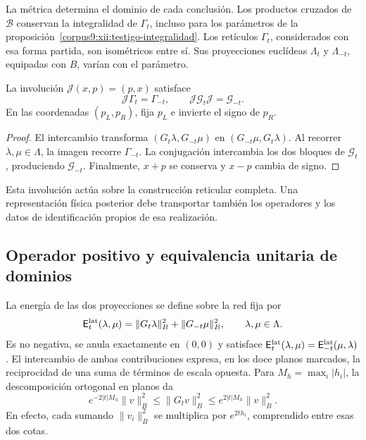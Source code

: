 La métrica determina el dominio de cada conclusión. Los productos
cruzados de \(\mathcal B\) conservan la integralidad de
\(\Gamma_t\), incluso para los parámetros de la
proposición~\ref{corpus9:xii:testigo-integralidad}. Los retículos
\(\Gamma_t\), considerados con esa forma partida, son isométricos
entre sí. Sus proyecciones euclídeas \(\Lambda_t\) y
\(\Lambda_{-t}\), equipadas con \(B\), varían con el parámetro.

\begin{proposition}
\label{corpus9:xii:involucion-partida}
La involución \(\mathcal J(x,p)=(p,x)\) satisface
\[
 \mathcal J\Gamma_t=\Gamma_{-t},\qquad
 \mathcal J\mathcal G_t\mathcal J=\mathcal G_{-t}.
\]
En las coordenadas \((p_L,p_R)\), fija \(p_L\) e invierte
el signo de \(p_R\).
\end{proposition}
\begin{proof}
El intercambio transforma \((G_t\lambda,G_{-t}\mu)\) en
\((G_{-t}\mu,G_t\lambda)\). Al recorrer \(\lambda,\mu\in\Lambda\),
la imagen recorre \(\Gamma_{-t}\). La conjugación intercambia los
dos bloques de \(\mathcal G_t\), produciendo \(\mathcal G_{-t}\).
Finalmente, \(x+p\) se conserva y \(x-p\) cambia de signo.
\end{proof}

Esta involución actúa sobre la construcción reticular completa. Una
representación física posterior debe transportar también los operadores
y los datos de identificación propios de esa realización.

\subsection{Operador positivo y equivalencia unitaria de dominios}
\label{corpus9:xii:energia-reticular}

La energía de las dos proyecciones se define sobre la red fija por
\begin{equation}
 \mathsf E_t^{\rm lat}(\lambda,\mu)
 =\|G_t\lambda\|_B^2+\|G_{-t}\mu\|_B^2,
 \qquad \lambda,\mu\in\Lambda.
 \label{corpus9:xii:energia}
\end{equation}
Es no negativa, se anula exactamente en \((0,0)\) y satisface
\(\mathsf E_t^{\rm lat}(\lambda,\mu)
=\mathsf E_{-t}^{\rm lat}(\mu,\lambda)\). El intercambio de ambas
contribuciones expresa, en los doce planos marcados, la reciprocidad
de una suma de términos de escala opuesta. Para
\(M_h=\max_i|h_i|\), la descomposición ortogonal en planos da
\begin{equation}
 e^{-2|t|M_h}\|v\|_B^2\leq\|G_tv\|_B^2
                    \leq e^{2|t|M_h}\|v\|_B^2.
 \label{corpus9:xii:cotas-cuadraticas}
\end{equation}
En efecto, cada sumando \(\|v_i\|_B^2\) se multiplica por
\(e^{2th_i}\), comprendido entre esas dos cotas.

